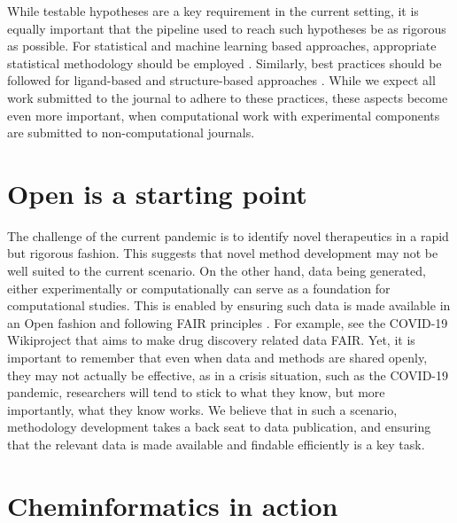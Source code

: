 \documentclass{bmcart}
\begin{document}
While testable hypotheses are a key requirement in the current
setting, it is equally important that the pipeline used to reach such
hypotheses be as rigorous as possible. For statistical and machine
learning based approaches, appropriate statistical methodology should
be employed \cite{cc_stats_1,cc_stats_2, cc_stats_3}. Similarly, best
practices should be followed for ligand-based \cite{qsar_1, qsar_2}
and structure-based approaches \cite{sbdd_1, sbdd_2}. While we expect
all work submitted to the journal to adhere to these practices, these aspects
become even more important, when computational work with experimental
components are submitted to non-computational journals.


\section*{Open is a starting point}

The challenge of the current pandemic is to identify novel
therapeutics in a rapid but rigorous fashion. This suggests that novel
method development may not be well suited to the current scenario. On
the other hand, data being generated, either experimentally or
computationally can serve as a foundation for computational
studies. This is enabled by ensuring such data is made available in an
Open fashion and following FAIR principles \cite{fair-1, fair-2}. For
example, see the COVID-19 Wikiproject \cite{wikidata} that aims to
make drug discovery related data FAIR. Yet, it is important to
remember that even when data and methods are shared openly, they may
not actually be effective, as in a crisis situation, such as the
COVID-19 pandemic, researchers will tend to stick to what they know,
but more importantly, what they know works. We believe that in such a
scenario, methodology development takes a back seat to data
publication, and ensuring that the relevant data is made available and
findable efficiently is a key task.

\section*{Cheminformatics in action}
\label{sec:chem-acti}
\end{document}
